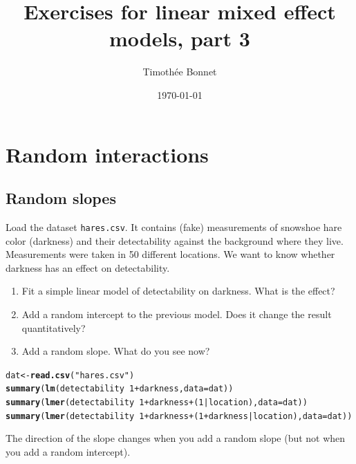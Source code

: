 \documentclass[12pt,a4paper]{scrartcl}\usepackage[]{graphicx}\usepackage[]{color}
\title{Exercises for linear mixed effect models, part 3}
\date{\today}
\author{Timoth\'ee Bonnet}
\makeatletter
\newcommand{\hlnum}[1]{\textcolor[rgb]{0.686,0.059,0.569}{#1}}%
\newcommand{\hlstr}[1]{\textcolor[rgb]{0.192,0.494,0.8}{#1}}%
\newcommand{\hlopt}[1]{\textcolor[rgb]{0,0,0}{#1}}%
\newcommand{\hlstd}[1]{\textcolor[rgb]{0.345,0.345,0.345}{#1}}%
\newcommand{\hlkwb}[1]{\textcolor[rgb]{0.69,0.353,0.396}{#1}}%
\newcommand{\hlkwc}[1]{\textcolor[rgb]{0.333,0.667,0.333}{#1}}%
\newcommand{\hlkwd}[1]{\textcolor[rgb]{0.737,0.353,0.396}{\textbf{#1}}}%
\newenvironment{kframe}{%
 \def\at@end@of@kframe{}%
 \ifinner\ifhmode%
  \def\at@end@of@kframe{\end{minipage}}%
  \begin{minipage}{\columnwidth}%
 \fi\fi%
 \def\FrameCommand##1{\hskip\@totalleftmargin \hskip-\fboxsep
 \colorbox{shadecolor}{##1}\hskip-\fboxsep
     \hskip-\linewidth \hskip-\@totalleftmargin \hskip\columnwidth}%
 \MakeFramed {\advance\hsize-\width
   \@totalleftmargin\z@ \linewidth\hsize
   \@setminipage}}%
 {\par\unskip\endMakeFramed%
 \at@end@of@kframe}
\newenvironment{knitrout}{}{} %
\makeatother
\begin{document}
\maketitle

\tableofcontents
\ListOfExerciseInToc
{}

\clearpage



\section{Random interactions}

\subsection{Random slopes}



\begin{Exercise}[difficulty=1, title={Random slopes and unbalanced data}]
Load the dataset \texttt{hares.csv}. It contains (fake) measurements of snowshoe hare color (darkness) and their detectability against the background where they live. Measurements were taken in 50 different locations. We want to know whether darkness has an effect on detectability. 
\begin{enumerate}
  \item Fit a simple linear model of detectability on darkness. What is the effect?
  \item Add a random intercept to the previous model. Does it change the result quantitatively?
  \item Add a random slope. What do you see now?
\end{enumerate}
\end{Exercise}
\begin{Answer}
\begin{knitrout}
\color{fgcolor}\begin{kframe}
\begin{alltt}
\hlstd{dat} \hlkwb{<-} \hlkwd{read.csv}\hlstd{(}\hlstr{"hares.csv"}\hlstd{)}
\hlkwd{summary}\hlstd{(}\hlkwd{lm}\hlstd{(detectability} \hlopt{~} \hlnum{1} \hlopt{+} \hlstd{darkness,} \hlkwc{data} \hlstd{= dat) )}
\hlkwd{summary}\hlstd{(}\hlkwd{lmer}\hlstd{(detectability} \hlopt{~} \hlnum{1} \hlopt{+} \hlstd{darkness} \hlopt{+} \hlstd{(}\hlnum{1}\hlopt{|}\hlstd{location),} \hlkwc{data} \hlstd{= dat) )}
\hlkwd{summary}\hlstd{(}\hlkwd{lmer}\hlstd{(detectability} \hlopt{~} \hlnum{1} \hlopt{+} \hlstd{darkness} \hlopt{+} \hlstd{(}\hlnum{1}\hlopt{+}\hlstd{darkness}\hlopt{|}\hlstd{location),} \hlkwc{data} \hlstd{= dat) )}
\end{alltt}
\end{kframe}
\end{knitrout}
The direction of the slope changes when you add a random slope (but not when you add a random intercept).
\end{Answer}
\end{document}
